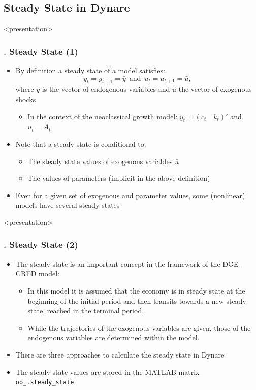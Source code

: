 \documentclass[11pt,aspectratio=169]{beamer}
\begin{document}
\subsection{Steady State in Dynare}
\begin{frame}<presentation>
	\frametitle{{\thesection.\thesubsection} Steady State (1)}
	\begin{itemize}
		\item By definition a steady state of a model satisfies: $$y_t=y_{t+1}=\bar{y} \enspace \text{and} \enspace u_t=u_{t+1}=\bar{u},$$
		where $y$ is the vector of endogenous variables and $u$ the vector of exogenous shocks
		\begin{itemize}
			\item In the context of the neoclassical growth model: $y_t=(c_t \quad k_t)'$ and $u_t=A_t$
		\end{itemize}
		\item Note that a steady state is conditional to:
		\begin{itemize}
			\item The steady state values of exogenous variables $\bar{u}$
			\item The values of parameters (implicit in the above definition)
		\end{itemize}
		\item Even for a given set of exogenous and parameter values, some (nonlinear) models have several steady states
	\end{itemize}
\end{frame}
\begin{frame}<presentation>
	\frametitle{{\thesection.\thesubsection} Steady State (2)}
	\begin{itemize}
		\item The steady state is an important concept in the framework of the DGE-CRED model:
		\begin{itemize}
			\item In this model it is assumed that the economy is in steady state at the beginning of the initial period and then transits towards a new steady state, reached in the terminal period.
			\item While the trajectories of the exogenous variables are given, those of the endogenous variables are determined within the model.
		\end{itemize}
		\item There are three approaches to calculate the steady state in Dynare
		\item The steady state values are stored in the MATLAB matrix \texttt{oo\_.steady\_state}
	\end{itemize}
\end{frame}
\end{document}
